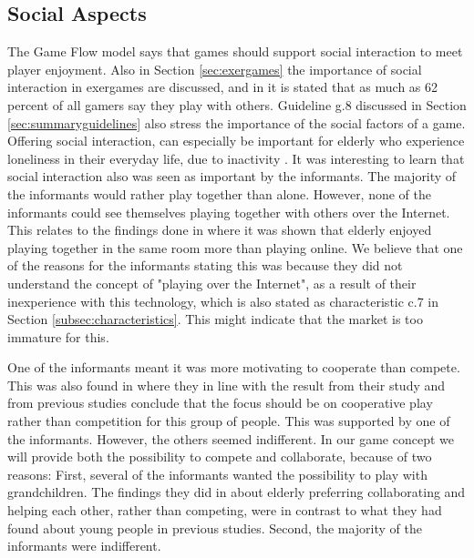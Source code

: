 \subsection{Social Aspects}
The Game Flow model says that games should support social interaction to meet player enjoyment. Also in Section \ref{sec:exergames} the importance of social interaction in exergames are discussed, and  in \cite{statistics2012} it is stated that as much as 62 percent of all gamers say they play with others. Guideline g.8 discussed in Section \ref{sec:summaryguidelines} also stress the importance of the social factors of a game. Offering social interaction, can especially be important for elderly who experience loneliness in their everyday life, due to inactivity \cite{exergamesforelderly}. It was interesting to learn that social interaction also was seen as important by the informants. The majority of the informants would rather play together than alone. However, none of the informants could see themselves playing together with others over the Internet. This relates to the findings done in \cite{Gajadhar} where it was shown that elderly enjoyed playing together in the same room more than playing online. We believe that one of the reasons for the informants stating this was because they did not understand the concept of "playing over the Internet", as a result of their inexperience with this technology, which is also stated as characteristic c.7 in Section \ref{subsec:characteristics}. This might indicate that the market is too immature for this. 

One of the informants meant it was more motivating to cooperate than compete. This was also found in \cite{Gajadhar} where they in line with the result from their study and from previous studies conclude that the focus should be on cooperative play rather than competition for this group of people. This was supported by one of the informants. However, the others seemed indifferent. In our game concept we will provide both the possibility to compete and collaborate, because of two reasons: First, several of the informants wanted the possibility to play with grandchildren. The findings they did in \cite{Gajadhar} about elderly preferring collaborating and helping each other, rather than competing, were in contrast to what they had found about young people in previous studies. Second, the majority of the informants were indifferent. 
 

